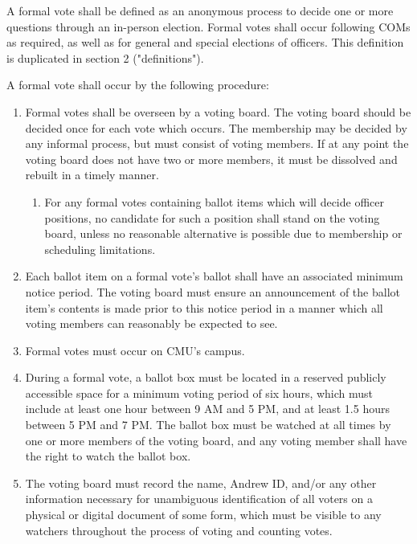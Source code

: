 \documentclass[11pt]{article}
\newcounter{h1}
\newcounter{h2}[h1]
\newcounter{h3}[h2]
\begin{document}


A formal vote shall be defined as an anonymous process to decide one or more questions through an in-person election. Formal votes shall occur following COMs as required, as well as for general and special elections of officers. This definition is duplicated in section 2 ("definitions").


A formal vote shall occur by the following procedure:

\begin{enumerate}
  \item Formal votes shall be overseen by a voting board. The voting board should be decided once for each vote which occurs. The membership may be decided by any informal process, but must consist of voting members. If at any point the voting board does not have two or more members, it must be dissolved and rebuilt in a timely manner.  
  \begin{enumerate}
    \item For any formal votes containing ballot items which will decide officer positions, no candidate for such a position shall stand on the voting board, unless no reasonable alternative is possible due to membership or scheduling limitations.  
  \end{enumerate}
  \item Each ballot item on a formal vote's ballot shall have an associated minimum notice period. The voting board must ensure an announcement of the ballot item's contents is made prior to this notice period in a manner which all voting members can reasonably be expected to see.  
  \item Formal votes must occur on CMU's campus.  
  \item During a formal vote, a ballot box must be located in a reserved publicly accessible space for a minimum voting period of six hours, which must include at least one hour between 9 AM and 5 PM, and at least 1.5 hours between 5 PM and 7 PM. The ballot box must be watched at all times by one or more members of the voting board, and any voting member shall have the right to watch the ballot box.  
  \item The voting board must record the name, Andrew ID, and/or any other information necessary for unambiguous identification of all voters on a physical or digital document of some form, which must be visible to any watchers throughout the process of voting and counting votes.  

\end{enumerate}
\end{document}

